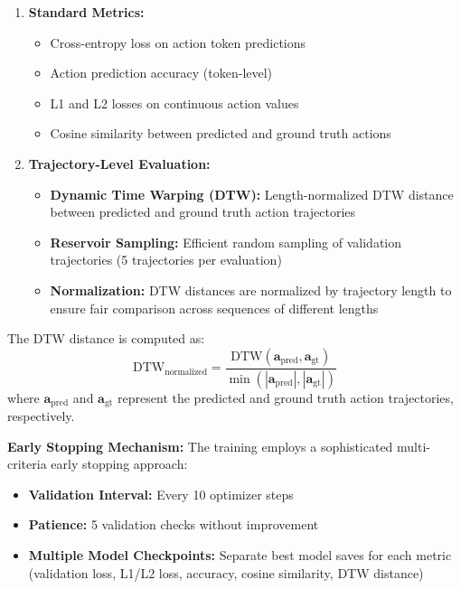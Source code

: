 \begin{enumerate}
    \item \textbf{Standard Metrics:}
    \begin{itemize}
        \item Cross-entropy loss on action token predictions
        \item Action prediction accuracy (token-level)
        \item L1 and L2 losses on continuous action values
        \item Cosine similarity between predicted and ground truth actions
    \end{itemize}
    
    \item \textbf{Trajectory-Level Evaluation:}
    \begin{itemize}
        \item \textbf{Dynamic Time Warping (DTW):} Length-normalized DTW distance between predicted and ground truth action trajectories
        \item \textbf{Reservoir Sampling:} Efficient random sampling of validation trajectories (5 trajectories per evaluation)
        \item \textbf{Normalization:} DTW distances are normalized by trajectory length to ensure fair comparison across sequences of different lengths
    \end{itemize}
\end{enumerate}

The DTW distance is computed as:
\begin{equation}
\text{DTW}_{\text{normalized}} = \frac{\text{DTW}(\mathbf{a}_{\text{pred}}, \mathbf{a}_{\text{gt}})}{\min(|\mathbf{a}_{\text{pred}}|, |\mathbf{a}_{\text{gt}}|)}
\end{equation}
where $\mathbf{a}_{\text{pred}}$ and $\mathbf{a}_{\text{gt}}$ represent the predicted and ground truth action trajectories, respectively.

\textbf{Early Stopping Mechanism:} The training employs a sophisticated multi-criteria early stopping approach:
\begin{itemize}
    \item \textbf{Validation Interval:} Every 10 optimizer steps
    \item \textbf{Patience:} 5 validation checks without improvement
    \item \textbf{Multiple Model Checkpoints:} Separate best model saves for each metric (validation loss, L1/L2 loss, accuracy, cosine similarity, DTW distance)
\end{itemize}

